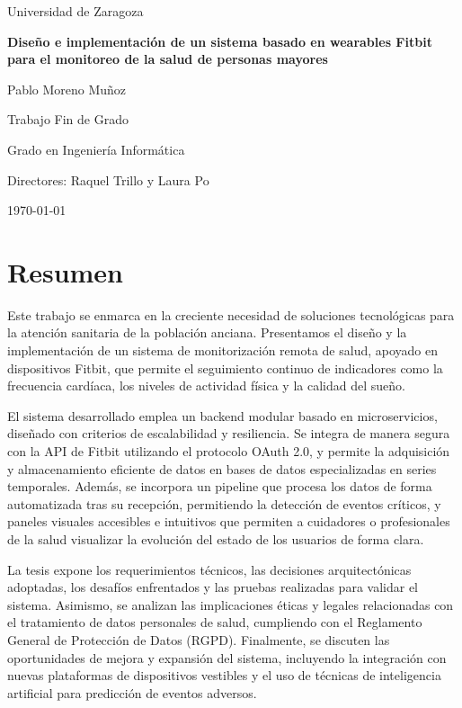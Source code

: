 \documentclass[12pt, a4paper, oneside]{book}
\begin{document}
\begin{titlepage}
    \centering
    \vspace*{2cm}
    {\LARGE Universidad de Zaragoza \par}
    \vspace{1cm}
    {\Huge\bfseries Diseño e implementación de un sistema basado en wearables Fitbit para el monitoreo de la salud de personas mayores \par}
    \vspace{2cm}
    {\Large Pablo Moreno Muñoz \par}
    \vspace{1cm}
    {\large Trabajo Fin de Grado \par}
    \vspace{1cm}
    {\large Grado en Ingeniería Informática \par}
    \vspace{1cm}
    {\large Directores: Raquel Trillo y Laura Po \par}
    \vspace{2cm}
    {\large \today \par}
\end{titlepage}

\chapter*{Resumen}
 Este trabajo se enmarca en la creciente necesidad de soluciones tecnológicas para la atención sanitaria de la población anciana. Presentamos el diseño y la implementación de un sistema de monitorización remota de salud, apoyado en dispositivos Fitbit, que permite el seguimiento continuo de indicadores como la frecuencia cardíaca, los niveles de actividad física y la calidad del sueño.

El sistema desarrollado emplea un backend modular basado en microservicios, diseñado con criterios de escalabilidad y resiliencia. Se integra de manera segura con la API de Fitbit utilizando el protocolo OAuth 2.0, y permite la adquisición y almacenamiento eficiente de datos en bases de datos especializadas en series temporales.  Además, se incorpora un pipeline que procesa los datos de forma automatizada tras su recepción, permitiendo la detección de eventos críticos, y paneles visuales accesibles e intuitivos que permiten a cuidadores o profesionales de la salud visualizar la evolución del estado de los usuarios de forma clara.

La tesis expone los requerimientos técnicos, las decisiones arquitectónicas adoptadas, los desafíos enfrentados y las pruebas realizadas para validar el sistema. Asimismo, se analizan las implicaciones éticas y legales relacionadas con el tratamiento de datos personales de salud, cumpliendo con el Reglamento General de Protección de Datos (RGPD). Finalmente, se discuten las oportunidades de mejora y expansión del sistema, incluyendo la integración con nuevas plataformas de dispositivos vestibles y el uso de técnicas de inteligencia artificial para predicción de eventos adversos.
\end{document}
